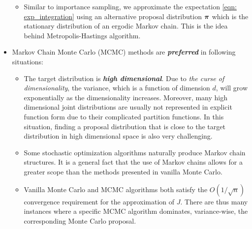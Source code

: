 \documentclass[11pt]{article}
\begin{document}
\begin{itemize}
\begin{itemize}
\item Similar to importance sampling, we approximate the expectation \eqref{eqn: exp_integration} using an alternative proposal distribution $\boldsymbol{\pi}$ which is the stationary distribution of an ergodic Markov chain. This is the idea behind Metropolis-Hastings algorithm. 
\end{itemize}

\item  Markov Chain Monte Carlo (MCMC) methods are \emph{\textbf{preferred}} in following situations:
\begin{itemize}
\item The target distribution is \emph{\textbf{high dimensional}}. Due to \emph{the curse of dimensionality}, the variance, which is a function of dimension $d$, will grow exponentially as the dimensionality increases. Moreover, many high dimensional joint distributions are usually not represented in explicit function form due to their complicated partition functions. In this situation, finding a proposal distribution that is close to the target distribution in high dimensional space is also very challenging.

\item Some stochastic optimization algorithms naturally produce Markov chain structures. It is a general fact that the use of Markov chains allows for a greater scope than the methods presented in vanilla Monte Carlo.

\item Vanilla Monte Carlo and MCMC algorithms both satisfy the $O(1/\sqrt{n})$ convergence requirement for the approximation of $J$. There are thus many instances where a specific MCMC algorithm dominates, variance-wise, the corresponding Monte Carlo proposal. 
\end{itemize}
 \end{itemize}
\end{document}

